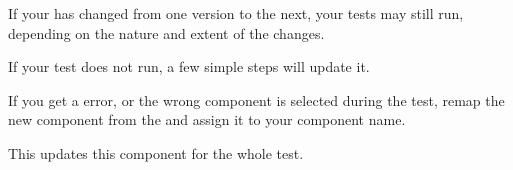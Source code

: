
\label{omchanges}
If your \gdaut{} has changed from one version to the next, your tests may still run, depending on the nature and extent of the changes. 


If your test does not run, a few simple steps will update it.

If you get a  error, or the wrong component is selected during the test, remap the new component from the \gdaut{} and assign it to your component name. 

This updates this component for the whole test. 


\clearpage
